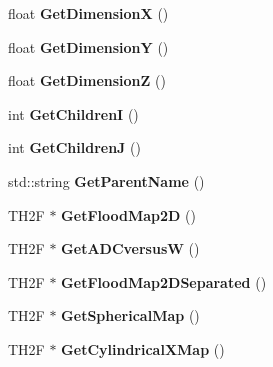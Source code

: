 \begin{DoxyCompactItemize}
\item 
\hypertarget{classElement_ad02bc3fa1779c70ae5f71da8569e4a25}{float {\bfseries Get\+Dimension\+X} ()}\label{classElement_ad02bc3fa1779c70ae5f71da8569e4a25}

\item 
\hypertarget{classElement_ac09017b6bb0145f254e6196350e4a2f3}{float {\bfseries Get\+Dimension\+Y} ()}\label{classElement_ac09017b6bb0145f254e6196350e4a2f3}

\item 
\hypertarget{classElement_abd9535fcf6b5918a090c68f13088f483}{float {\bfseries Get\+Dimension\+Z} ()}\label{classElement_abd9535fcf6b5918a090c68f13088f483}

\item 
\hypertarget{classElement_abec5fea86c8be1bfc8e797a5f72152c4}{int {\bfseries Get\+Children\+I} ()}\label{classElement_abec5fea86c8be1bfc8e797a5f72152c4}

\item 
\hypertarget{classElement_a11b2a4ce751161ef1752fd3a39493268}{int {\bfseries Get\+Children\+J} ()}\label{classElement_a11b2a4ce751161ef1752fd3a39493268}

\item 
\hypertarget{classElement_a8da798fc7a492f6d68c32e72e3764906}{std\+::string {\bfseries Get\+Parent\+Name} ()}\label{classElement_a8da798fc7a492f6d68c32e72e3764906}

\item 
\hypertarget{classElement_ab58130947efb1126d566e5074fbe2a98}{T\+H2\+F $\ast$ {\bfseries Get\+Flood\+Map2\+D} ()}\label{classElement_ab58130947efb1126d566e5074fbe2a98}

\item 
\hypertarget{classElement_aea2af6bb32440632f398d12e6fb6db9d}{T\+H2\+F $\ast$ {\bfseries Get\+A\+D\+Cversus\+W} ()}\label{classElement_aea2af6bb32440632f398d12e6fb6db9d}

\item 
\hypertarget{classElement_a97ef42c709b407a4c17289e7c91218dd}{T\+H2\+F $\ast$ {\bfseries Get\+Flood\+Map2\+D\+Separated} ()}\label{classElement_a97ef42c709b407a4c17289e7c91218dd}

\item 
\hypertarget{classElement_a92e1e05aedd6727139a11dc942a3b129}{T\+H2\+F $\ast$ {\bfseries Get\+Spherical\+Map} ()}\label{classElement_a92e1e05aedd6727139a11dc942a3b129}

\item 
\hypertarget{classElement_a2c335eb77b8583ddd2c24953f92da87a}{T\+H2\+F $\ast$ {\bfseries Get\+Cylindrical\+X\+Map} ()}\label{classElement_a2c335eb77b8583ddd2c24953f92da87a}


\end{DoxyCompactItemize}
